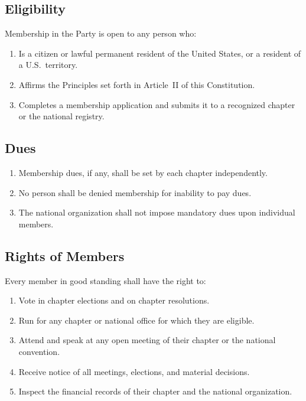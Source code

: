 \documentclass[11pt, letterpaper]{article}
\begin{document}

\subsection{Eligibility}
Membership in the Party is open to any person who:
\begin{enumerate}
  \item Is a citizen or lawful permanent resident of the United States, or a resident of a U.S.\ territory.
  \item Affirms the Principles set forth in Article~II of this Constitution.
  \item Completes a membership application and submits it to a recognized chapter or the national registry.
\end{enumerate}

\subsection{Dues}
\begin{enumerate}
  \item Membership dues, if any, shall be set by each chapter independently.
  \item No person shall be denied membership for inability to pay dues.
  \item The national organization shall not impose mandatory dues upon individual members.
\end{enumerate}

\subsection{Rights of Members}
Every member in good standing shall have the right to:
\begin{enumerate}
  \item Vote in chapter elections and on chapter resolutions.
  \item Run for any chapter or national office for which they are eligible.
  \item Attend and speak at any open meeting of their chapter or the national convention.
  \item Receive notice of all meetings, elections, and material decisions.
  \item Inspect the financial records of their chapter and the national organization.
\end{enumerate}
\end{document}
